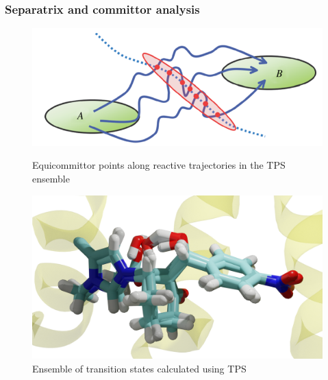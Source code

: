 \documentclass{beamer}
\begin{document}
\begin{frame}
\frametitle{Separatrix and committor analysis}
\begin{figure}[ht!]
\centering
\begin{minipage}[b]{0.45\linewidth}
\includegraphics[scale=0.2]{figures/separatrix-full.png}
\caption{Equicommittor points along reactive trajectories in the TPS ensemble}
\label{fig:minipage1}
\end{minipage}
\quad
\begin{minipage}[b]{0.45\linewidth}
\includegraphics[scale=0.08]{figures/trans-ensemble.png}
\caption{Ensemble of transition states calculated using TPS}
\label{fig:minipage2}
\end{minipage}
\end{figure}
%
%
\end{frame}
\end{document}
